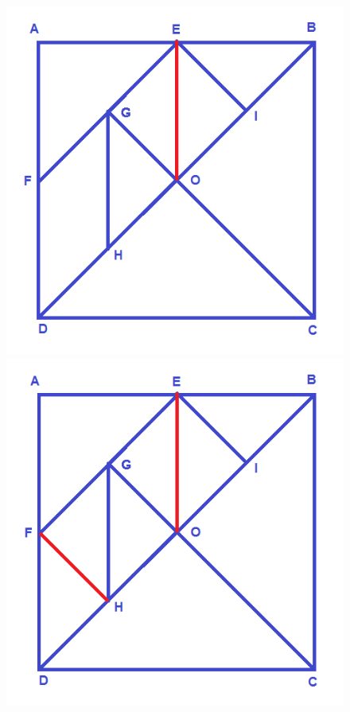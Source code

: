 	\begin{figure}[H]
	\centering
	\vspace*{-10pt}
	\includegraphics[scale=0.25]{image10}\quad
	\includegraphics[scale=0.25]{image11}\quad

\end{figure}
